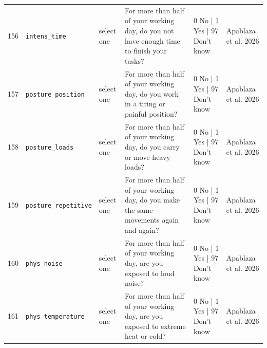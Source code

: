 \documentclass[9pt,a4paper,landscape]{article}
\begin{document}
\begin{longtable}{@{}p{0.5cm}p{3.3cm}p{1.7cm}p{7.3cm}p{5.6cm}p{5.4cm}@{}}
\footnotesize 156 & \footnotesize\texttt{intens\_time} & \scriptsize select one & \footnotesize For more than half of your working day, do you not have enough time to finish your tasks?\par\vspace{1pt}{\footnotesize\color{hdr}{\hifont काम के दिन के आधे से ज़्यादा समय, क्या आपके पास काम पूरा करने के लिए काफ़ी समय नहीं होता?}} & \scriptsize 0 No | 1 Yes | 97 Don't know & \scriptsize Apablaza et al. 2026\\
\footnotesize 157 & \footnotesize\texttt{posture\_position} & \scriptsize select one & \footnotesize For more than half of your working day, do you work in a tiring or painful position?\par\vspace{1pt}{\footnotesize\color{hdr}{\hifont काम के दिन के आधे से ज़्यादा समय, क्या आप थकाने वाली या दर्द वाली स्थिति में काम करते हैं?}} & \scriptsize 0 No | 1 Yes | 97 Don't know & \scriptsize Apablaza et al. 2026\\
\footnotesize 158 & \footnotesize\texttt{posture\_loads} & \scriptsize select one & \footnotesize For more than half of your working day, do you carry or move heavy loads?\par\vspace{1pt}{\footnotesize\color{hdr}{\hifont काम के दिन के आधे से ज़्यादा समय, क्या आप भारी बोझ उठाते या ढोते हैं?}} & \scriptsize 0 No | 1 Yes | 97 Don't know & \scriptsize Apablaza et al. 2026\\
\footnotesize 159 & \footnotesize\texttt{posture\_repetitive} & \scriptsize select one & \footnotesize For more than half of your working day, do you make the same movements again and again?\par\vspace{1pt}{\footnotesize\color{hdr}{\hifont काम के दिन के आधे से ज़्यादा समय, क्या आप एक ही तरह की हरकत बार-बार करते हैं?}} & \scriptsize 0 No | 1 Yes | 97 Don't know & \scriptsize Apablaza et al. 2026\\
\footnotesize 160 & \footnotesize\texttt{phys\_noise} & \scriptsize select one & \footnotesize For more than half of your working day, are you exposed to loud noise?\par\vspace{1pt}{\footnotesize\color{hdr}{\hifont काम के दिन के आधे से ज़्यादा समय, क्या आप तेज़ शोर में रहते हैं?}} & \scriptsize 0 No | 1 Yes | 97 Don't know & \scriptsize Apablaza et al. 2026\\
\footnotesize 161 & \footnotesize\texttt{phys\_temperature} & \scriptsize select one & \footnotesize For more than half of your working day, are you exposed to extreme heat or cold?\par\vspace{1pt}{\footnotesize\color{hdr}{\hifont काम के दिन के आधे से ज़्यादा समय, क्या आप बहुत गर्मी या बहुत ठंड में रहते हैं?}} & \scriptsize 0 No | 1 Yes | 97 Don't know & \scriptsize Apablaza et al. 2026\\
\bottomrule\end{longtable}\vspace{6pt}
\end{document}
